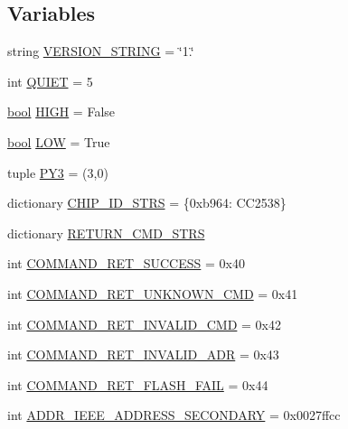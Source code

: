 \subsection*{Variables}
\begin{DoxyCompactItemize}
\item 
string \hyperlink{namespacecc2538-bsl_a4f3168eb7c345d93d26768c21ae7d91f}{V\+E\+R\+S\+I\+O\+N\+\_\+\+S\+T\+R\+I\+NG} = \char`\"{}1.\char`\"{}
\item 
int \hyperlink{namespacecc2538-bsl_a2fdb38475537f7360cac8166a901a13d}{Q\+U\+I\+ET} = 5
\item 
\hyperlink{_p_e___types_8h_a97a80ca1602ebf2303258971a2c938e2}{bool} \hyperlink{namespacecc2538-bsl_a46969c4c645f3f2ed5951863eddd9d3e}{H\+I\+GH} = False
\item 
\hyperlink{_p_e___types_8h_a97a80ca1602ebf2303258971a2c938e2}{bool} \hyperlink{namespacecc2538-bsl_a4422a4b08ec663102510038fb6ca33cf}{L\+OW} = True
\item 
tuple \hyperlink{namespacecc2538-bsl_afd1439a276d4da23475c41e75b1fa6b6}{P\+Y3} = (3,0)
\item 
dictionary \hyperlink{namespacecc2538-bsl_a270540d5e74ff733d9fd51a85d5483da}{C\+H\+I\+P\+\_\+\+I\+D\+\_\+\+S\+T\+RS} = \{0xb964\+: \textquotesingle{}\+C\+C2538\textquotesingle{}\}
\item 
dictionary \hyperlink{namespacecc2538-bsl_a2e0f0c5f66be862bf98afbb209447a19}{R\+E\+T\+U\+R\+N\+\_\+\+C\+M\+D\+\_\+\+S\+T\+RS}
\item 
int \hyperlink{namespacecc2538-bsl_a9d2b2cd58cea80dd935b10fa0796efa1}{C\+O\+M\+M\+A\+N\+D\+\_\+\+R\+E\+T\+\_\+\+S\+U\+C\+C\+E\+SS} = 0x40
\item 
int \hyperlink{namespacecc2538-bsl_a10516a88ce45b7211739a7ceecd54fd2}{C\+O\+M\+M\+A\+N\+D\+\_\+\+R\+E\+T\+\_\+\+U\+N\+K\+N\+O\+W\+N\+\_\+\+C\+MD} = 0x41
\item 
int \hyperlink{namespacecc2538-bsl_a225ced7eee00b2e93a98515cf4593c28}{C\+O\+M\+M\+A\+N\+D\+\_\+\+R\+E\+T\+\_\+\+I\+N\+V\+A\+L\+I\+D\+\_\+\+C\+MD} = 0x42
\item 
int \hyperlink{namespacecc2538-bsl_a19cccd46f4e548d88322ef19bca4fbdb}{C\+O\+M\+M\+A\+N\+D\+\_\+\+R\+E\+T\+\_\+\+I\+N\+V\+A\+L\+I\+D\+\_\+\+A\+DR} = 0x43
\item 
int \hyperlink{namespacecc2538-bsl_ab7f920b6c58b607b8fe6c3e8163e3f89}{C\+O\+M\+M\+A\+N\+D\+\_\+\+R\+E\+T\+\_\+\+F\+L\+A\+S\+H\+\_\+\+F\+A\+IL} = 0x44
\item 
int \hyperlink{namespacecc2538-bsl_a73c3339699702fa3c34c4a638042137d}{A\+D\+D\+R\+\_\+\+I\+E\+E\+E\+\_\+\+A\+D\+D\+R\+E\+S\+S\+\_\+\+S\+E\+C\+O\+N\+D\+A\+RY} = 0x0027ffcc

\end{DoxyCompactItemize}
